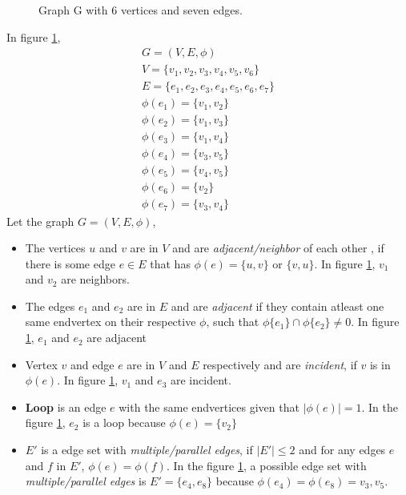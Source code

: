 \begin{itemize}
\begin{figure}[h!]
\caption{Graph G with 6 vertices and seven edges.}
\label{graph1}
\end{figure}
In figure \ref{graph1}, 
\begin{equation}
\begin{array}{l}
G=(V,E,\phi) \\
V=\{v_1,v_2,v_3,v_4,v_5,v_6\} \\
E=\{e_1,e_2,e_3,e_4,e_5,e_6,e_7\} \\
\phi(e_1)=\{v_1,v_2\} \\
\phi(e_2)=\{v_1,v_3\} \\
\phi(e_3)=\{v_1,v_4\} \\
\phi(e_4)=\{v_3,v_5\} \\
\phi(e_5)=\{v_4,v_5\} \\
\phi(e_6)=\{v_2\} \\
\phi(e_7)=\{v_3,v_4\}
\end{array}
\end{equation}
Let the graph $G=(V,E,\phi)$,
	\begin{itemize}
\item The vertices $u$ and $v$ are in $V$ and are \textit{adjacent/neighbor} of each other , if there is some edge $e \in E$ that has $\phi(e)=\{u,v\}$ or $\{v,u\}$. In figure \ref{graph1}, $v_1$ and $v_2$ are neighbors.
\item The edges $e_1$ and $e_2$ are in $E$ and are \textit{adjacent} if they contain atleast one same endvertex on their respective $\phi$, such that $\phi\{e_1\} \cap \phi\{e_2\} \neq 0$. In figure \ref{graph1}, $e_1$ and $e_2$ are adjacent
\item Vertex $v$ and edge $e$ are in $V$ and $E$ respectively and are \textit{incident}, if $v$ is in $\phi(e)$. In figure \ref{graph1}, $v_1$ and $e_3$ are incident.
\item \textbf{Loop} is an edge $e$ with the same endvertices given that $|\phi(e)|=1$. In the figure \ref{graph1}, $e_2$ is a loop because $\phi(e)=\{v_2\}$
\item $E'$ is a edge set with \textit{multiple/parallel edges}, if $|E'| \leq 2$ and for any edges $e$ and $f$ in $E'$, $\phi(e)=\phi(f)$. In the figure \ref{graph1}, a possible edge set with \textit{multiple/parallel edges} is $E'=\{e_4,e_8\}$ because $\phi(e_4)=\phi(e_8)={v_3,v_5}$.

\end{itemize}
\end{itemize}
